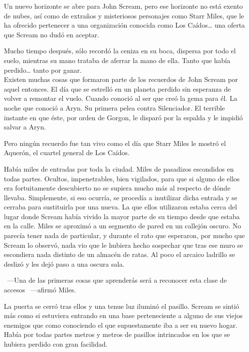\begin{prev}
    Un nuevo horizonte se abre para John Scream, pero ese horizonte no está exento de nubes, así como de extraños y misteriosos personajes como Starr Miles, que le ha ofrecido pertenecer a una organización conocida como Los Caídos\dots{} una oferta que Scream no dudó en aceptar.
\end{prev}

\noindent{}Mucho tiempo después, sólo recordó la ceniza en su boca, dispersa por todo el suelo, mientras su mano trataba de aferrar la mano de ella. Tanto que había perdido\dots{} tanto por ganar.\\

\noindent{}Existen muchas cosas que formaron parte de los recuerdos de John Scream por aquel entonces. El día que se estrelló en un planeta perdido sin esperanza de volver a remontar el vuelo. Cuando conoció al ser que creó la gema para él. La noche que conoció a Aryn. Su primera pelea contra Silenciador. El terrible instante en que éste, por orden de Gorgon, le disparó por la espalda y le impidió salvar a Aryn.

Pero ningún recuerdo fue tan vivo como el día que Starr Miles le mostró el Aquerón, el cuartel general de Los Caídos.

Había miles de entradas por toda la ciudad. Miles de pasadizos escondidos en todas partes. Ocultos, impenetrables, bien vigilados, para que si alguno de ellos era fortuitamente descubierto no se supiera mucho más al respecto de dónde llevaba. Simplemente, si eso ocurría, se procedía a inutilizar dicha entrada y se cerraba para sustituirla por una nueva. La que ellos utilizaron estaba cerca del lugar donde Scream había vivido la mayor parte de su tiempo desde que estaba en la calle. Miles se aproximó a un segmento de pared en un callejón oscuro. No parecía tener nada de particular, y durante el rato que esperaron, por mucho que Scream lo observó, nada vio que le hubiera hecho sospechar que tras ese muro se escondiera nada distinto de un almacén de ratas. Al poco el arcaico ladrillo se deslizó y les dejó paso a una oscura sala.

~---Una de las primeras cosas que aprenderás será a reconocer esta clase de accesos ~---afirmó Miles.

La puerta se cerró tras ellos y una tenue luz iluminó el pasillo. Scream se sintió más como si estuviera entrando en una base perteneciente a alguno de sus viejos enemigos que como conociendo el que supuestamente iba a ser su nuevo hogar. Había por todas partes metros y metros de pasillos intrincados en los que se hubiera perdido con gran facilidad.

